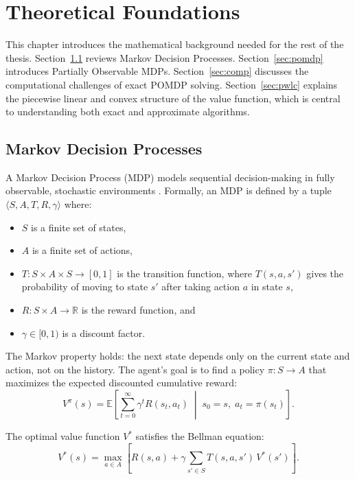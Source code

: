 \chapter{Theoretical Foundations}
\label{chap:theory}

This chapter introduces the mathematical background needed for the rest of the thesis.
Section~\ref{sec:mdp} reviews Markov Decision Processes.
Section~\ref{sec:pomdp} introduces Partially Observable MDPs.
Section~\ref{sec:comp} discusses the computational challenges of exact POMDP solving.
Section~\ref{sec:pwlc} explains the piecewise linear and convex structure of the value function, which is central to understanding both exact and approximate algorithms.


\section{Markov Decision Processes}
\label{sec:mdp}

A Markov Decision Process (MDP) models sequential decision-making in fully observable, stochastic environments \cite{algorithmsSequentialDecisionMaking}.
Formally, an MDP is defined by a tuple $\langle S, A, T, R, \gamma \rangle$ where:
\begin{itemize}
  \item $S$ is a finite set of states,
  \item $A$ is a finite set of actions,
  \item $T: S \times A \times S \rightarrow [0,1]$ is the transition function, where $T(s, a, s')$ gives the probability of moving to state $s'$ after taking action $a$ in state $s$,
  \item $R: S \times A \rightarrow \mathbb{R}$ is the reward function, and
  \item $\gamma \in [0,1)$ is a discount factor.
\end{itemize}

The Markov property holds: the next state depends only on the current state and action, not on the history.
The agent's goal is to find a policy $\pi: S \rightarrow A$ that maximizes the expected discounted cumulative reward:
\begin{equation}
  V^\pi(s) = \mathbb{E}\!\left[\sum_{t=0}^{\infty} \gamma^t R(s_t, a_t) \;\middle|\; s_0 = s,\; a_t = \pi(s_t)\right].
\end{equation}

The optimal value function $V^*$ satisfies the Bellman equation:
\begin{equation}
  V^*(s) = \max_{a \in A} \left[ R(s, a) + \gamma \sum_{s' \in S} T(s, a, s')\, V^*(s') \right].
\end{equation}

